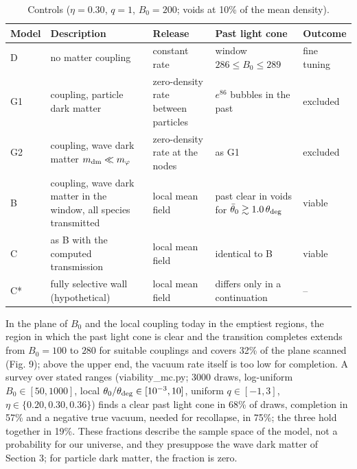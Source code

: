 \documentclass[preprint,12pt]{elsarticle}
\begin{document}
\begin{table}[htbp]\centering\small
\caption{Controls ($\eta=0.30$, $q=1$, $B_0=200$; voids at 10\% of the mean density).}
\begin{tabular}{>{\raggedright\arraybackslash}p{0.131\dimexpr\textwidth-10\tabcolsep\relax}>{\raggedright\arraybackslash}p{0.297\dimexpr\textwidth-10\tabcolsep\relax}>{\raggedright\arraybackslash}p{0.173\dimexpr\textwidth-10\tabcolsep\relax}>{\raggedright\arraybackslash}p{0.268\dimexpr\textwidth-10\tabcolsep\relax}>{\raggedright\arraybackslash}p{0.131\dimexpr\textwidth-10\tabcolsep\relax}}
\toprule
Model & Description & Release & Past light cone & Outcome \\ \midrule
D & no matter coupling & constant rate & window $286\le B_0\le289$ & fine tuning \\
G1 & coupling, particle dark matter & zero-density rate between particles & $e^{86}$ bubbles in the past & excluded \\
G2 & coupling, wave dark matter $m_{\rm dm}\ll m_\varphi$ & zero-density rate at the nodes & as G1 & excluded \\
B & coupling, wave dark matter in the window, all species transmitted & local mean field & past clear in voids for $\bar\theta_0\gtrsim1.0\,\theta_{\rm deg}$ & viable \\
C & as B with the computed transmission & local mean field & identical to B & viable \\
C* & fully selective wall (hypothetical) & local mean field & differs only in a continuation & -- \\
\bottomrule
\end{tabular}
\end{table}
In the plane of $B_0$ and the local coupling today in the emptiest regions, the region in which the past light cone is clear and the transition completes extends from $B_0=100$ to $280$ for suitable couplings and covers 32\% of the plane scanned (Fig. 9); above the upper end, the vacuum rate itself is too low for completion. A survey over stated ranges (viability\_mc.py; 3000 draws, log-uniform $B_0\in[50,1000]$, local $\theta_0/\theta_{\rm deg}\in[10^{-3},10]$, uniform $q\in[-1,3]$, $\eta\in\{0.20,0.30,0.36\}$) finds a clear past light cone in 68\% of draws, completion in 57\% and a negative true vacuum, needed for recollapse, in 75\%; the three hold together in 19\%. These fractions describe the sample space of the model, not a probability for our universe, and they presuppose the wave dark matter of Section 3; for particle dark matter, the fraction is zero.
\end{document}
